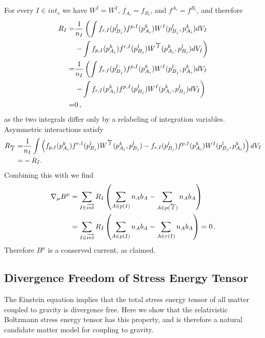 For every $I\in int_s$ we have $W^I=W^{\overleftarrow{I}}$, $f_{A_i}=f_{B_i}$, and $f^{A_i}=f^{B_i}$, and therefore
\begin{align}
R_I=&\frac{1}{n_I}\left(\int f_{r,I}(p_{B_j}^l)f^{p,I}(p_{A_i}^k)W^I(p_{B_j}^l,p_{A_i}^k)  dV_I \right.\\
&\left. -\int f_{p,I}(p_{A_i}^k)f^{r,I}(p_{B_j}^l)W^{\overleftarrow{I}}(p_{A_i}^k,p_{B_j}^l)  dV_I\right)\notag\\
=&\frac{1}{n_I}\left(\int f_{r,I}(p_{B_j}^l)f^{p,I}(p_{A_i}^k)W^I(p_{B_j}^l,p_{A_i}^k)  dV_I \right.\notag\\
&\left. -\int f_{r,I}(p_{A_i}^k)f^{p,I}(p_{B_j}^l)W^{I}(p_{A_i}^k,p_{B_j}^l)  dV_I\right)\notag\\
=&0\,,\notag
\end{align}
as the two integrals differ only by a relabeling of integration variables.  Asymmetric interactions satisfy
\begin{align}
R_{\overleftarrow{I}}=&\frac{1}{n_I}\int\left(f_{p,I}(p_{A_i}^k)f^{r,I}(p_{B_j}^l)W^{\overleftarrow{I}}(p_{A_i}^k,p_{B_j}^l) 
-f_{r,I}(p_{B_j}^l)f^{p,I}(p_{A_i}^k)W^I(p_{B_j}^l,p_{A_i}^k)\right)  dV_I\notag\\
=&-R_I.
\end{align}
Combining this with  we find
\begin{align}
\nabla_\mu B^\mu&=\sum_{I\in\overrightarrow{int}}R_I\left(\sum_{A\in p(I)} n_Ab_A-\sum_{A\in p(\overleftarrow{I})} n_Ab_A\right)\\
&=\sum_{I\in\overrightarrow{int}}R_I\left(\sum_{A\in p(I)} n_Ab_A-\sum_{A\in r(I)} n_Ab_A\right)=0\,.\notag
\end{align}
Therefore  $B^\mu$ is a conserved current, as claimed.

\subsection{Divergence Freedom of Stress Energy Tensor}
The Einstein equation implies that the total stress energy tensor of all matter coupled to gravity is divergence free.  Here we show that the relativistic Boltzmann stress energy tensor  has this property, and is therefore a natural candidate matter model for  coupling to gravity.  

